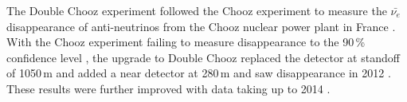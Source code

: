 The Double Chooz experiment followed the Chooz experiment to measure the $\bar{\nu_e}$ disappearance of anti-neutrinos from  the Chooz nuclear power plant in France \cite{lasserre2006}. With the Chooz experiment failing to measure disappearance to the 90\,\% confidence level \cite{Apollonio_2003}, the upgrade to Double Chooz replaced the detector at standoff of 1050\,m and added a near detector at 280\,m and saw disappearance in 2012 \cite{Abe_2012}. These results were further improved with data taking up to 2014 \cite{abe2014improved}.

